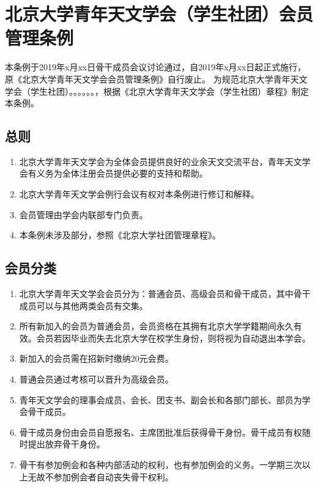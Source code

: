 \chapter{北京大学青年天文学会（学生社团）会员管理条例}

本条例于2019年x月xx日骨干成员会议讨论通过，自2019年x月xx日起正式施行，原《北京大学青年天文学会会员管理条例》自行废止。
为规范北京大学青年天文学会（学生社团）。。。。。。，根据《北京大学青年天文学会（学生社团）章程》制定本条例。

\section{总则}

\begin{enumerate}
    \item 北京大学青年天文学会为全体会员提供良好的业余天文交流平台，青年天文学会有义务为全体注册会员提供必要的支持和帮助。
    
    \item 北京大学青年天文学会例行会议有权对本条例进行修订和解释。
    
    \item 会员管理由学会内联部专门负责。
    
    \item 本条例未涉及部分，参照《北京大学社团管理章程》。
\end{enumerate}

\section{会员分类}

\begin{enumerate}[resume]
    \item 北京大学青年天文学会会员分为：普通会员、高级会员和骨干成员，其中骨干成员可以与其他两类会员有交集。
    
    \item 所有新加入的会员为普通会员，会员资格在其拥有北京大学学籍期间永久有效。会员若因毕业而失去北京大学在校学生身份，则将视为自动退出本学会。
    
    \item 新加入的会员需在招新时缴纳20元会费。
    
    \item 普通会员通过考核可以晋升为高级会员。
    
    \item 青年天文学会的理事会成员、会长、团支书、副会长和各部门部长、部员为学会骨干成员。
    
    \item 骨干成员身份由会员自愿报名、主席团批准后获得骨干身份。骨干成员有权随时提出放弃骨干身份。
    
    \item 骨干有参加例会和各种内部活动的权利，也有参加例会的义务。一学期三次以上无故不参加例会者自动丧失骨干权利。
\end{enumerate}

